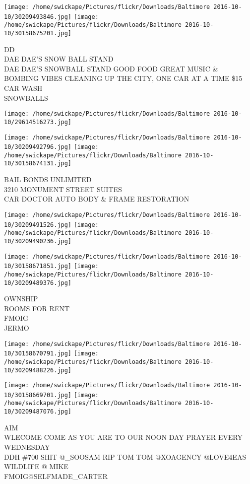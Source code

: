 \documentclass[10pt,letterpaper]{article}
\begin{document}
\texttt{[image: /home/swickape/Pictures/flickr/Downloads/Baltimore 2016-10-10/30209493846.jpg]}
\texttt{[image: /home/swickape/Pictures/flickr/Downloads/Baltimore 2016-10-10/30158675201.jpg]}

DD\\
DAE DAE'S SNOW BALL STAND\\
DAE DAE'S SNOWBALL STAND GOOD FOOD GREAT MUSIC \& BOMBING VIBES CLEANING UP THE CITY, ONE CAR AT A TIME \$15 CAR WASH\\
SNOWBALLS
\pagebreak

\texttt{[image: /home/swickape/Pictures/flickr/Downloads/Baltimore 2016-10-10/29614516273.jpg]}

\vspace{0.25in}
\texttt{[image: /home/swickape/Pictures/flickr/Downloads/Baltimore 2016-10-10/30209492796.jpg]}
\texttt{[image: /home/swickape/Pictures/flickr/Downloads/Baltimore 2016-10-10/30158674131.jpg]}

BAIL BONDS UNLIMITED\\
3210 MONUMENT STREET SUITES\\
CAR DOCTOR AUTO BODY \& FRAME RESTORATION
\pagebreak

\texttt{[image: /home/swickape/Pictures/flickr/Downloads/Baltimore 2016-10-10/30209491526.jpg]}
\texttt{[image: /home/swickape/Pictures/flickr/Downloads/Baltimore 2016-10-10/30209490236.jpg]}

\texttt{[image: /home/swickape/Pictures/flickr/Downloads/Baltimore 2016-10-10/30158671851.jpg]}
\texttt{[image: /home/swickape/Pictures/flickr/Downloads/Baltimore 2016-10-10/30209489376.jpg]}

OWNSHIP\\
ROOMS FOR RENT\\
FMOIG\\
JERMO
\pagebreak

\texttt{[image: /home/swickape/Pictures/flickr/Downloads/Baltimore 2016-10-10/30158670791.jpg]}
\texttt{[image: /home/swickape/Pictures/flickr/Downloads/Baltimore 2016-10-10/30209488226.jpg]}

\texttt{[image: /home/swickape/Pictures/flickr/Downloads/Baltimore 2016-10-10/30158669701.jpg]}
\texttt{[image: /home/swickape/Pictures/flickr/Downloads/Baltimore 2016-10-10/30209487076.jpg]}

AIM\\
WLECOME COME AS YOU ARE TO OUR NOON DAY PRAYER EVERY WEDNESDAY\\
DDH \#700 SHIT @\_SOOSAM RIP TOM TOM @XOAGENCY @LOVE4EAS WILDLIFE @ MIKE\\
FMOIG@SELFMADE\_CARTER
\pagebreak
\end{document}
